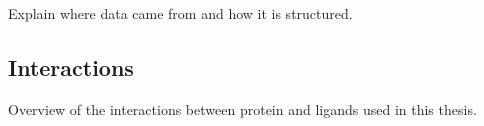 Explain where data came from and how it is structured.

\subsection{Interactions}
Overview of the interactions between protein and ligands used in this thesis.